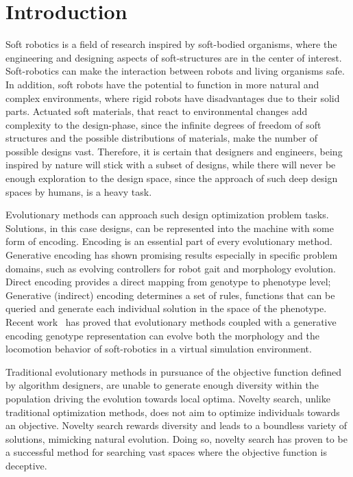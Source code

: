 
\chapter{Introduction} %

\label{Chapter1} %


Soft robotics is a field of research inspired by soft-bodied organisms, where the engineering and designing aspects of soft-structures are in the center of interest. Soft-robotics can make the interaction between robots and living organisms safe. In addition, soft robots have the potential to function in more natural and  complex environments, where rigid robots have disadvantages due to their solid parts. Actuated soft materials, that react to environmental changes add complexity to the design-phase, since the infinite degrees of freedom of soft structures and the possible distributions of materials, make the number of possible designs vast. Therefore, it is certain that designers and engineers, being inspired by nature will stick with a subset of designs, while there will never be enough exploration to the design space, since the approach of such deep design spaces by humans, is a heavy task.

Evolutionary methods can approach such design optimization problem tasks. Solutions, in this case designs, can be represented into the machine with some form of encoding. Encoding is an essential part of every evolutionary method. Generative encoding has shown promising results especially in specific problem domains, such as evolving controllers for robot gait and morphology evolution. Direct encoding provides a direct mapping from genotype to phenotype level; Generative (indirect) encoding determines a set of rules, functions that can be queried and generate each individual solution in the space of the phenotype. Recent work~\citep{cheney2013unshackling} has proved that evolutionary methods coupled with a generative encoding genotype representation can evolve both the morphology and the locomotion behavior of soft-robotics in a virtual simulation environment.

Traditional evolutionary methods in pursuance of the objective function defined by algorithm designers, are unable to generate enough diversity within the population driving the evolution towards local optima. Novelty search, unlike traditional optimization methods, does not aim to optimize individuals towards an objective. Novelty search rewards diversity and leads to a boundless variety of solutions, mimicking natural evolution. Doing so, novelty search has proven to be a successful method for searching vast spaces where the objective function is deceptive.

